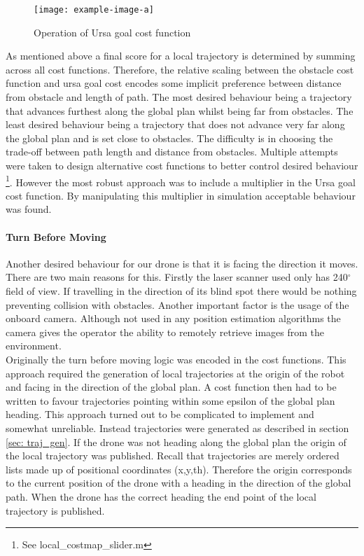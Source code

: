 \documentclass[capstone_report.tex]{subfiles}
\begin{document}
\begin{figure}[H]
    \centering
    \texttt{[image: example-image-a]}
    \caption{Operation of Ursa goal cost function}\label{fig:ugcf}
\end{figure}

As mentioned above a final score for a local trajectory is determined by summing across all cost functions.  Therefore, the relative scaling between the obstacle cost function and ursa goal cost encodes some implicit preference between distance from obstacle and length of path.  The most desired behaviour being a trajectory that advances furthest along the global plan whilst being far from obstacles.  The least desired behaviour being a trajectory that does not advance very far along the global plan and is set close to obstacles.  The difficulty is in choosing the trade-off between path length and distance from obstacles.  Multiple attempts were taken to design alternative cost functions to better control desired behaviour \footnote{See local\_costmap\_slider.m}.  However the most robust approach was to include a multiplier in the Ursa goal cost function.  By manipulating this multiplier in simulation acceptable behaviour was found.

\paragraph{Turn Before Moving}
Another desired behaviour for our drone is that it is facing the direction it moves.  There are two main reasons for this.  Firstly the laser scanner used only has 240$^\circ$ field of view.  If travelling in the direction of its blind spot there would be nothing preventing collision with obstacles.  Another important factor is the usage of the onboard camera.  Although not used in any position estimation algorithms the camera gives the operator the ability to remotely retrieve images from the environment.\\

Originally the turn before moving logic was encoded in the cost functions.  This approach required the generation of local trajectories at the origin of the robot and facing in the direction of the global plan.  A cost function then had to be written to favour trajectories pointing within some epsilon of the global plan heading.  This approach turned out to be complicated to implement and somewhat unreliable.  Instead trajectories were generated as described in section \ref{sec: traj_gen}.  If the drone was not heading along the global plan the origin of the local trajectory was published.  Recall that trajectories are merely ordered lists made up of positional coordinates (x,y,th).  Therefore the origin corresponds to the current position of the drone with a heading in the direction of the global path.  When the drone has the correct heading the end point of the local trajectory is published.
\end{document}
